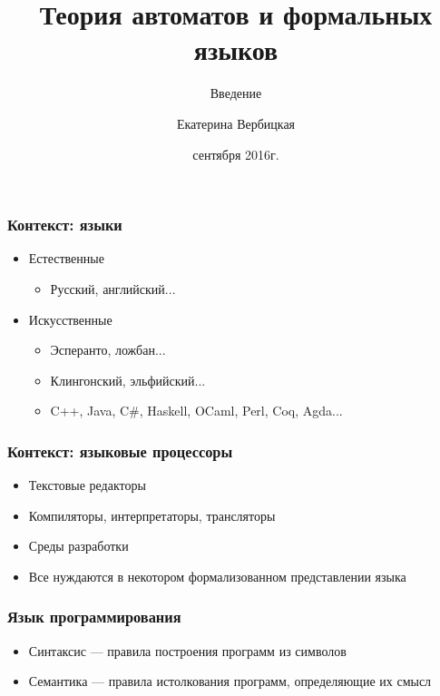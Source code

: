 \documentclass{beamer}
\title[]{Теория автоматов и формальных языков}
\subtitle[]{Введение}
\institute[]{
Санкт-Петербургский государственный электротехнический университет <<ЛЭТИ>>\\
}
\author[]{Екатерина Вербицкая}
\date{ сентября 2016г.}
\begin{document}
{
  \begin{frame}
    \titlepage
  \end{frame}
}


\begin{frame}[fragile]
  \transwipe[direction=90]
  \frametitle{Контекст: языки}
  \begin{itemize}
    \item Естественные 
    \begin{itemize}
      \item Русский, английский...
    \end{itemize}    
    \pause
    \item Искусственные
    \begin{itemize}
      \item Эсперанто, ложбан...
      \item Клингонский, эльфийский...
      \pause
      \item C++, Java, C\#, Haskell, OCaml, Perl, Coq, Agda...
    \end{itemize}
  \end{itemize}
\end{frame}
            

\begin{frame}[fragile]
  \transwipe[direction=90]
  \frametitle{Контекст: языковые процессоры}
  \begin{itemize}
    \item Текстовые редакторы
    \item Компиляторы, интерпретаторы, трансляторы
    \item Среды разработки
  \end{itemize}

  \begin{itemize}
    \item Все нуждаются в некотором формализованном представлении языка
  \end{itemize}
\end{frame}

\begin{frame}[fragile]
  \transwipe[direction=90]
  \frametitle{Язык программирования}
  \begin{itemize}
    \item Синтаксис --- правила построения программ из символов
    \item Семантика --- правила истолкования программ, определяющие их смысл
  \end{itemize}
\end{frame}
\end{document}
